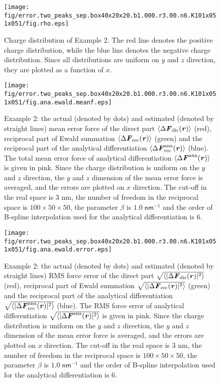 \documentclass[aps,pre,preprint]{revtex4-1}
\renewcommand{\v}[1]{\textbf{\textit{#1}}}
\begin{document}
\begin{figure}
  \centering
  \texttt{[image: fig/error.two\_peaks\_sep.box40x20x20.b1.000.r3.00.n6.K101x051x051/fig.rho.eps]}
  \caption{Charge distribution of Example 2. The red line
    denotes the positive charge distribution, while the blue line
    denotes the negative charge distribution. Since all distributions
    are uniform on $y$ and $z$ direction, they are plotted as a
    function of $x$.}
  \label{fig:tmp-rho2}
\end{figure}

\begin{figure}
  \centering
  \texttt{[image: fig/error.two\_peaks\_sep.box40x20x20.b1.000.r3.00.n6.K101x051x051/fig.ana.ewald.meanf.eps]}
  \caption{Example 2: the actual (denoted by dots) and estimated
    (denoted by straight lines) mean error force of the direct part
    $\langle\Delta \v F_{\textrm{dir}}(\v r)\rangle$ (red), reciprocal
    part of Ewald summation $\langle\Delta \v F_{\textrm{rec}}(\v
    r)\rangle$ (green) and the reciprocal part of the analytical
    differentiation $\langle\Delta \v
    F^{\textrm{ana}}_{\textrm{rec}}(\v r)\rangle$ (blue). The total
    mean error force of analytical differentiation $\langle\Delta \v
    F^{\textrm{ana}}(\v r)\rangle$ is given in pink.  Since the charge
    distribution is uniform on the $y$ and $z$ direction, the $y$ and
    $z$ dimension of the mean error force is averaged, and the errors
    are plotted on $x$ direction.  The cut-off in the real space is 3
    \textsf{nm}, the number of freedom in the reciprocal space is
    $100\times 50\times 50$, the parameter $\beta$ is $1.0\;
    \textsf{nm}^{-1}$ and the order of B-spline interpolation used for
    the analytical differentiation is 6.}
  \label{fig:meanf2}
\end{figure}


\begin{figure}
  \centering
  \texttt{[image: fig/error.two\_peaks\_sep.box40x20x20.b1.000.r3.00.n6.K101x051x051/fig.ana.ewald.error.eps]}
  \caption{Example 2: the actual (denoted by dots) and estimated
    (denoted by straight lines) RMS force error of the direct part
    $\sqrt{\langle\vert\Delta \v F_{\textrm{dir}}(\v
      r)\vert^2\rangle}$ (red), reciprocal part of Ewald summation
    $\sqrt{\langle\vert\Delta \v F_{\textrm{rec}}(\v
      r)\vert^2\rangle}$ (green) and the reciprocal part of the
    analytical differentiation $\sqrt{\langle\vert\Delta \v
      F^{\textrm{ana}}_{\textrm{rec}}(\v r)\vert^2\rangle}$
    (blue). The RMS force error of analytical differentiation
    $\sqrt{\langle\vert\Delta \v F^{\textrm{ana}}(\v
      r)\vert^2\rangle}$ is given in pink.  Since the charge
    distribution is uniform on the $y$ and $z$ direction, the $y$ and
    $z$ dimension of the mean error force is averaged, and the errors
    are plotted on $x$ direction.  The cut-off in the real space is 3
    \textsf{nm}, the number of freedom in the reciprocal space is
    $100\times 50\times 50$, the parameter $\beta$ is $1.0\;
    \textsf{nm}^{-1}$ and the order of B-spline interpolation used for
    the analytical differentiation is 6.}
  \label{fig:error2}
\end{figure}
\end{document}
